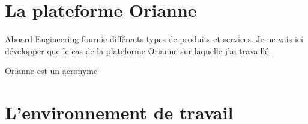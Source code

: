 \section{La plateforme Orianne}
\label{sec:orianne}

Aboard Engineering fournie différents types de produits et services. Je ne vais ici développer que le cas de la plateforme Orianne sur laquelle j'ai travaillé.

Orianne est un acronyme

\section{L'environnement de travail}
\lipsum
